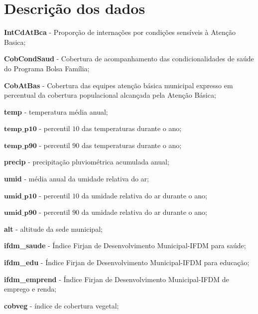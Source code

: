 \documentclass[12pt,a4paper]{article}\usepackage[]{graphicx}\usepackage[]{color}
\begin{document}



\tableofcontents  %





\newpage
\section{\textbf{{\LARGE\textbf{Descrição dos dados}}}}

\textbf{IntCdAtBca} - Proporção de internações por condições sensíveis à Atenção Basica;

\noindent
\textbf{CobCondSaud} - Cobertura de acompanhamento das condicionalidades de saúde do Programa Bolsa Família;

\noindent
\textbf{CobAtBas} - Cobertura das equipes atenção básica municipal expresso em percentual da cobertura populacional alcançada pela Atenção Básica;

\noindent
\textbf{temp} - temperatura média anual;

\noindent
$\mathbf{temp\_p10}$ - percentil $10$ das temperaturas durante o ano;

\noindent
$\mathbf{temp\_p90}$ - percentil $90$ das temperaturas durante o ano;

\noindent
\textbf{precip} - precipitação pluviométrica acumulada anual;

\noindent
\textbf{umid} - média anual da umidade relativa do ar;

\noindent
$\mathbf{umid\_p10}$ - percentil $10$ da umidade relativa do ar durante o ano;

\noindent
$\mathbf{umid\_p90}$ - percentil $90$ da umidade relativa do ar durante o ano;

\noindent
\textbf{alt} - altitude da sede municipal;

\noindent
\textbf{ifdm\_saude} - Índice Firjan de Desenvolvimento Municipal-IFDM para saúde;

\noindent
\textbf{ifdm\_edu} - Índice Firjan de Desenvolvimento Municipal-IFDM para educação;

\noindent
\textbf{ifdm\_emprend} - Índice Firjan de Desenvolvimento Municipal-IFDM de emprego e renda;

\noindent
\textbf{cobveg} - índice de cobertura vegetal;
\end{document}
